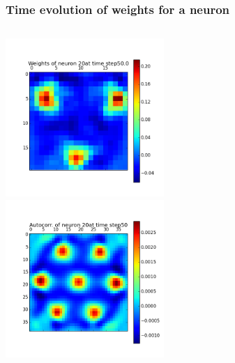 \begin{frame}
\frametitle{Time evolution of weights for a neuron}
\begin{columns}[t]
\centering
\includegraphics[width=6cm,height=6cm]{neurons/neuron_w_20_t_50.png}\\
\centering
\includegraphics[width=6cm,height=6cm]{neurons/neuron_a_20_t_50.png}\\
\end{columns}
\end{frame}

